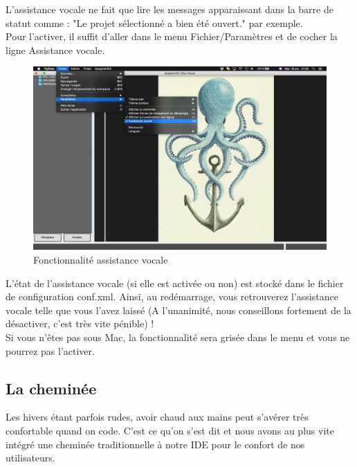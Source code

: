\documentclass[a4paper,12pt]{article}
\begin{document}
		L'assistance vocale ne fait que lire les messages apparaissant dans la barre de statut comme : "Le projet sélectionné a bien été ouvert." par exemple.\\
		
		Pour l'activer, il suffit d'aller dans le menu Fichier/Paramètres et de cocher la ligne Assistance vocale.
		
		\begin{figure}[h!]
			\begin{center}
					\includegraphics[scale=0.15]{images/assist_voc}
					\caption{Fonctionnalité assistance vocale}
			\end{center}
	\end{figure}
	
	L'état de l'assistance vocale (si elle est activée ou non) est stocké dans le fichier de configuration conf.xml. Ainsi, au redémarrage, vous retrouverez l'assistance vocale telle que vous l'avez laissé (A l'unanimité, nous conseillons fortement de la désactiver, c'est très vite pénible) !\\
	
	Si vous n'êtes pas sous Mac, la fonctionnalité sera grisée dans le menu et vous ne pourrez pas l'activer.
	
	\newpage
	
	\subsection{La cheminée}
	
		Les hivers étant parfois rudes, avoir chaud aux mains peut s'avérer très confortable quand on code. C'est ce qu'on s'est dit et nous avons au plus vite intégré une cheminée traditionnelle à notre IDE pour le confort de nos utilisateurs.\\
		
\end{document}

